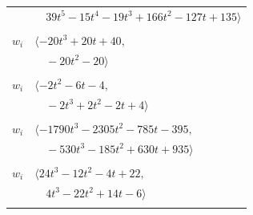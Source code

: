 \documentclass[11pt]{article}
\begin{document}
\begin{longtable}{@{}ll@{}}
 & $\quad 39t^{5}-15t^{4}-19t^{3}+166t^{2}-127t+135\rangle$\\
\addlinespace[2pt]
\multicolumn{2}{@{}p{0.97\textwidth}@{}}{$i=42$, $D_i=1$, $\rho_{ij}$: $4{:}2, \allowbreak 22{:}3, \allowbreak 24{:}1, \allowbreak 30{:}2, \allowbreak 34{:}1, \allowbreak 35{:}1, \allowbreak 46{:}1, \allowbreak 50{:}1, \allowbreak 54{:}2, \allowbreak 57{:}3$}\\
$w_i$ & $\langle -20t^{3}+20t+40,$\\
 & $\quad -20t^{2}-20\rangle$\\
\addlinespace[2pt]
\multicolumn{2}{@{}p{0.97\textwidth}@{}}{$i=43$, $D_i=1$, $\rho_{ij}$: $7{:}2, \allowbreak 12{:}3, \allowbreak 14{:}1, \allowbreak 31{:}2, \allowbreak 32{:}3, \allowbreak 45{:}2$}\\
$w_i$ & $\langle -2t^{2}-6t-4,$\\
 & $\quad -2t^{3}+2t^{2}-2t+4\rangle$\\
\addlinespace[2pt]
\multicolumn{2}{@{}p{0.97\textwidth}@{}}{$i=44$, $D_i=1$, $\rho_{ij}$: $0{:}3, \allowbreak 5{:}3, \allowbreak 6{:}2, \allowbreak 9{:}2, \allowbreak 12{:}1, \allowbreak 13{:}2, \allowbreak 19{:}2, \allowbreak 28{:}2, \allowbreak 29{:}2, \allowbreak 33{:}1, \allowbreak 35{:}1, \allowbreak 37{:}1, \allowbreak 46{:}2, \allowbreak 47{:}2, \allowbreak 50{:}1, \allowbreak 53{:}2, \allowbreak 54{:}2$}\\
$w_i$ & $\langle -1790t^{3}-2305t^{2}-785t-395,$\\
 & $\quad -530t^{3}-185t^{2}+630t+935\rangle$\\
\addlinespace[2pt]
\multicolumn{2}{@{}p{0.97\textwidth}@{}}{$i=45$, $D_i=1$, $\rho_{ij}$: $4{:}2, \allowbreak 7{:}2, \allowbreak 10{:}1, \allowbreak 21{:}2, \allowbreak 22{:}3, \allowbreak 33{:}1, \allowbreak 35{:}2, \allowbreak 38{:}1, \allowbreak 43{:}2, \allowbreak 53{:}3, \allowbreak 54{:}2$}\\
$w_i$ & $\langle 24t^{3}-12t^{2}-4t+22,$\\
 & $\quad 4t^{3}-22t^{2}+14t-6\rangle$\\
\addlinespace[2pt]
\multicolumn{2}{@{}p{0.97\textwidth}@{}}{$i=46$, $D_i=1$, $e_i=3$, $\rho_{ij}$: $2{:}2, \allowbreak 4{:}1, \allowbreak 6{:}1, \allowbreak 8{:}3, \allowbreak 9{:}2, \allowbreak 12{:}2, \allowbreak 22{:}3, \allowbreak 23{:}1, \allowbreak 26{:}1, \allowbreak 27{:}3, \allowbreak 30{:}1, \allowbreak 34{:}2, \allowbreak 37{:}2, \allowbreak 38{:}2, \allowbreak 39{:}1, \allowbreak 41{:}2, \allowbreak 42{:}3, \allowbreak 44{:}2, \allowbreak 49{:}3$}\\

\end{longtable}
\end{document}
